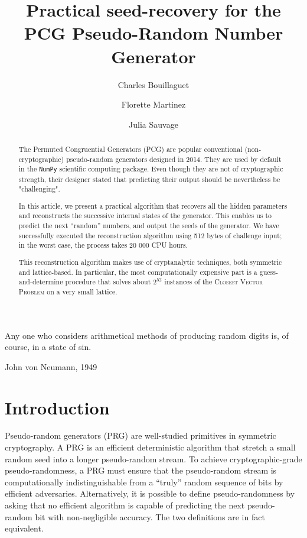 \documentclass[submission,svgnames,journal=tosc]{iacrtrans}
\title{Practical seed-recovery for the PCG Pseudo-Random Number Generator}
\author{Charles Bouillaguet\inst{1} \and Florette Martinez\inst{2} \and Julia Sauvage\inst{3}}
\institute{%
Univ. Lille, CNRS, Centrale Lille, UMR 9189 - CRIStAL - Centre de Recherche en Informatique Signal et Automatique de Lille, F-59000 Lille, France \\ 
\email{charles.bouillaguet@univ-lille.fr}
\and 
Sorbonne Université, CNRS, LIP6, F-75005 Paris, France \\
\email{florette.martinez@lip6.fr}
\and 
Sorbonne Université \\
\email{julia.sauvage@etu.upmc.fr}
}
\begin{document}
\maketitle


\begin{abstract}
  The Permuted Congruential Generators (\textsf{PCG}) are popular conventional
  (non-cryptographic) pseudo-random generators designed in 2014. They are used
  by default in the \texttt{NumPy} scientific computing package. Even though
  they are not of cryptographic strength, their designer stated that predicting
  their output should be nevertheless be "challenging".

  In this article, we present a practical algorithm that recovers all the hidden
  parameters and reconstructs the successive internal states of the
  generator. This enables us to predict the next ``random'' numbers, and output
  the seeds of the generator. We have successfully executed the reconstruction
  algorithm using 512 bytes of challenge input; in the worst case, the process
  takes 20 000 CPU hours.

  This reconstruction algorithm makes use of cryptanalytic techniques, both
  symmetric and lattice-based. In particular, the most computationally expensive
  part is a guess-and-determine procedure that solves about $2^{52}$ instances
  of the \textsc{Closest Vector Problem} on a very small lattice.
\end{abstract}


\epigraph{Any one who considers arithmetical methods of producing random digits is, of course, in a state of sin.}{John von Neumann, 1949}

\section{Introduction} 

Pseudo-random generators (PRG) are well-studied primitives in symmetric
cryptography. A PRG is an efficient deterministic algorithm that stretch a small
random seed into a longer pseudo-random stream. To achieve cryptographic-grade
pseudo-randomness, a PRG must ensure that the pseudo-random stream is
computationally indistinguishable from a ``truly'' random sequence of bits by
efficient adversaries. Alternatively, it is possible to define pseudo-randomness
by asking that no efficient algorithm is capable of predicting the next
pseudo-random bit with non-negligible accuracy. The two definitions are in fact
equivalent.
\end{document}
